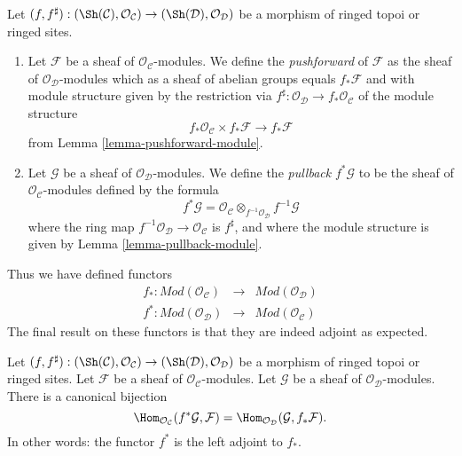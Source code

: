 \begin{definition}
\label{definition-pushforward}
Let
$(f, f^\sharp) :
(\Sh(\mathcal{C}), \mathcal{O}_\mathcal{C})
\to
(\Sh(\mathcal{D}), \mathcal{O}_\mathcal{D})$
be a morphism of ringed topoi or ringed sites.
\begin{enumerate}
\item Let $\mathcal{F}$ be a sheaf of $\mathcal{O}_\mathcal{C}$-modules.
We define the {\it pushforward} of $\mathcal{F}$ as the
sheaf of $\mathcal{O}_\mathcal{D}$-modules which as a sheaf
of abelian groups equals $f_*\mathcal{F}$ and with
module structure given by the restriction
via $f^\sharp : \mathcal{O}_\mathcal{D} \to f_*\mathcal{O}_\mathcal{C}$
of the module structure
$$
f_*\mathcal{O}_\mathcal{C} \times f_*\mathcal{F}
\longrightarrow
f_*\mathcal{F}
$$
from Lemma \ref{lemma-pushforward-module}.
\item Let $\mathcal{G}$ be a sheaf of $\mathcal{O}_\mathcal{D}$-modules.
We define the {\it pullback} $f^*\mathcal{G}$ to be the
sheaf of $\mathcal{O}_\mathcal{C}$-modules defined by the formula
$$
f^*\mathcal{G}
=
\mathcal{O}_\mathcal{C} \otimes_{f^{-1}\mathcal{O}_\mathcal{D}}
f^{-1}\mathcal{G}
$$
where the ring map
$f^{-1}\mathcal{O}_\mathcal{D} \to \mathcal{O}_\mathcal{C}$
is $f^\sharp$, and where the  module
structure is given by Lemma \ref{lemma-pullback-module}.
\end{enumerate}
\end{definition}

\noindent
Thus we have defined functors
\begin{eqnarray*}
f_* : \textit{Mod}(\mathcal{O}_\mathcal{C})
& \longrightarrow &
\textit{Mod}(\mathcal{O}_\mathcal{D}) \\
f^* : \textit{Mod}(\mathcal{O}_\mathcal{D})
& \longrightarrow &
\textit{Mod}(\mathcal{O}_\mathcal{C})
\end{eqnarray*}
The final result on these functors is that they are indeed
adjoint as expected.

\begin{lemma}
\label{lemma-adjoint-pullback-pushforward-modules}
Let
$(f, f^\sharp) :
(\Sh(\mathcal{C}), \mathcal{O}_\mathcal{C})
\to
(\Sh(\mathcal{D}), \mathcal{O}_\mathcal{D})$
be a morphism of ringed topoi or ringed sites.
Let $\mathcal{F}$ be a sheaf of $\mathcal{O}_\mathcal{C}$-modules.
Let $\mathcal{G}$ be a sheaf of $\mathcal{O}_\mathcal{D}$-modules.
There is a canonical bijection
$$
\Hom_{\mathcal{O}_\mathcal{C}}(f^*\mathcal{G}, \mathcal{F})
=
\Hom_{\mathcal{O}_\mathcal{D}}(\mathcal{G}, f_*\mathcal{F}).
$$
In other words: the functor $f^*$ is the left adjoint to
$f_*$.
\end{lemma}

